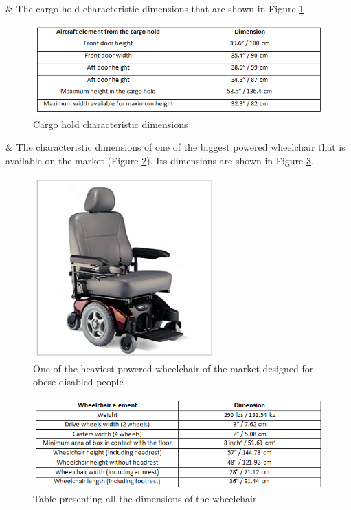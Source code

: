 \begin{easylist}[itemize]

& The cargo hold characteristic dimensions that are shown in Figure \ref{fig:cargo_hold_geometry_table} 

\begin{figure}[h]
\centering
\includegraphics[width=12cm]{images/cargo_hold_geometry_table.png}
\caption{Cargo hold characteristic dimensions}
\label{fig:cargo_hold_geometry_table}
\end{figure}

& The characteristic dimensions of one of the biggest powered wheelchair that is available on the market (Figure \ref{fig:heavy_wheelchair}). Its dimensions are shown in Figure \ref{fig:wheelchair_geometry_table}.

\begin{figure}[h]
\centering
\includegraphics[width=7cm]{images/heavy_wheelchair.png}
\caption{One of the heaviest powered wheelchair of the market designed for obese disabled people \cite{powerwheelchair}}
\label{fig:heavy_wheelchair}
\end{figure}

\begin{figure}[h]
\centering
\includegraphics[width=12cm]{images/wheelchair_geometry_table.png}
\caption{Table presenting all the dimensions of the wheelchair}
\label{fig:wheelchair_geometry_table}
\end{figure}

\end{easylist}

